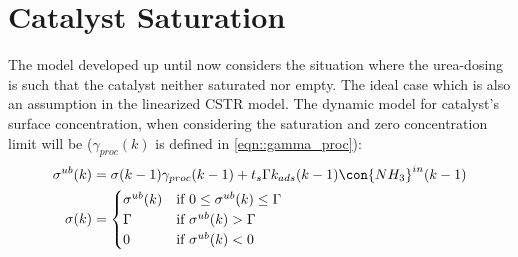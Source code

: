 \newpage
\section{Catalyst Saturation}

The model developed up until now considers the situation where the urea-dosing is such that the catalyst neither
saturated nor empty. The ideal case which is also an assumption in the linearized CSTR model. The dynamic model for
catalyst's surface concentration, when considering the saturation and zero concentration limit will be
($\gamma_{proc}(k)$ is defined in \ref{eqn::gamma_proc}):
\begin{align}
        \sigma^{ub}(k) &= \sigma (k-1) \gamma_{proc}(k-1) + t_s \Gamma k_{ads}(k-1) \con{NH_3}^{in}(k-1)
        \label{eqn::unbounded_sigma_mdl}\\
        \sigma(k) &= \begin{cases}
                                \sigma^{ub}(k) & \text{if }  0 \leq \sigma^{ub}(k) \leq \Gamma\\
                                \Gamma         & \text{if }  \sigma^{ub}(k) > \Gamma \\
                                0              & \text{if }  \sigma^{ub}(k) < 0
                        \end{cases}
        \label{eqn::actual_sigma_mdl}
\end{align}

